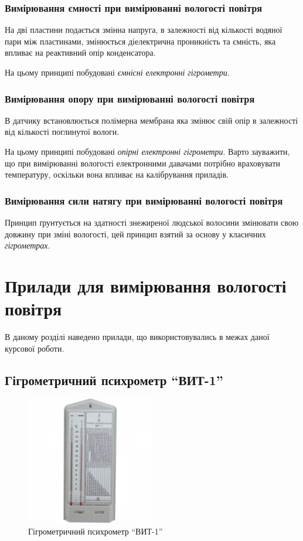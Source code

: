 \subsubsection{Вимірювання ємності  при вимірюванні вологості повітря}

На дві пластини подається змінна напруга, в залежності від кількості водяної пари між пластинами,
змінюється діелектрична проникність та ємність, яка впливає на реактивний опір конденсатора.

На цьому принципі побудовані \textit{ємнісні електронні гігрометри}.

\subsubsection{Вимірювання опору при вимірюванні вологості повітря}

В датчику встановлюється полімерна мембрана яка змінює свій опір в залежності від кількості
поглинутої вологи.

На цьому принципі побудовані \textit{опірні електронні гігрометри}. Варто зауважити, що при
вимірюванні вологості електронними давачами потрібно враховувати температуру, оскільки вона впливає
на калібрування приладів.

\subsubsection{Вимірювання сили натягу при вимірюванні вологості повітря}

Принцип ґрунтується на здатності знежиреної людської волосини змінювати свою довжину при зміні
вологості, цей принцип взятий за основу у класичних \textit{гігрометрах}.

\section{Прилади для вимірювання вологості повітря}

В даному розділі наведено прилади, що використовувались в межах даної курсової роботи.

\subsection{Гігрометричний психрометр ``ВИТ-1''}

\begin{figure}[!ht]
\centering
\includegraphics[width=0.5\textwidth]{./images/vit.jpg}
\caption{Гігрометричний психрометр ``ВИТ-1''}
\label{fig:vit}
\end{figure}

